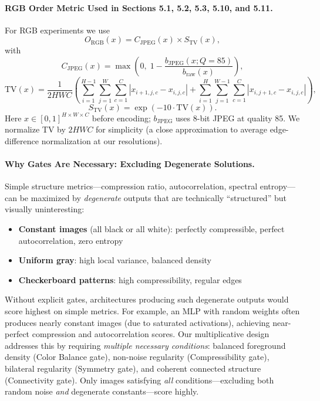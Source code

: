 \documentclass{article}
\begin{document}
\paragraph{RGB Order Metric Used in Sections 5.1, 5.2, 5.3, 5.10, and 5.11.}
For RGB experiments we use
\begin{equation}
O_{\text{RGB}}(x)=C_{\text{JPEG}}(x)\times S_{\text{TV}}(x),
\end{equation}
with
\begin{equation}
C_{\text{JPEG}}(x)=\max\!\left(0,\;1-\frac{b_{\text{JPEG}}(x;Q=85)}{b_{\text{raw}}(x)}\right),
\end{equation}
\begin{equation}
\text{TV}(x)=\frac{1}{2HWC}\left(
\sum_{i=1}^{H-1}\sum_{j=1}^{W}\sum_{c=1}^{C}|x_{i+1,j,c}-x_{i,j,c}|+
\sum_{i=1}^{H}\sum_{j=1}^{W-1}\sum_{c=1}^{C}|x_{i,j+1,c}-x_{i,j,c}|
\right),
\end{equation}
\begin{equation}
S_{\text{TV}}(x)=\exp(-10\cdot \text{TV}(x)).
\end{equation}
Here $x\in[0,1]^{H\times W\times C}$ before encoding; $b_{\text{JPEG}}$ uses 8-bit JPEG at quality 85. We normalize TV by $2HWC$ for simplicity (a close approximation to average edge-difference normalization at our resolutions).

\paragraph{Why Gates Are Necessary: Excluding Degenerate Solutions.}
Simple structure metrics---compression ratio, autocorrelation, spectral entropy---can be maximized by \emph{degenerate} outputs that are technically ``structured'' but visually uninteresting:
\begin{itemize}[topsep=2pt,itemsep=2pt]
    \item \textbf{Constant images} (all black or all white): perfectly compressible, perfect autocorrelation, zero entropy
    \item \textbf{Uniform gray}: high local variance, balanced density
    \item \textbf{Checkerboard patterns}: high compressibility, regular edges
\end{itemize}
Without explicit gates, architectures producing such degenerate outputs would score highest on simple metrics. For example, an MLP with random weights often produces nearly constant images (due to saturated activations), achieving near-perfect compression and autocorrelation scores. Our multiplicative design addresses this by requiring \emph{multiple necessary conditions}: balanced foreground density (Color Balance gate), non-noise regularity (Compressibility gate), bilateral regularity (Symmetry gate), and coherent connected structure (Connectivity gate). Only images satisfying \emph{all} conditions---excluding both random noise \emph{and} degenerate constants---score highly.
\end{document}
